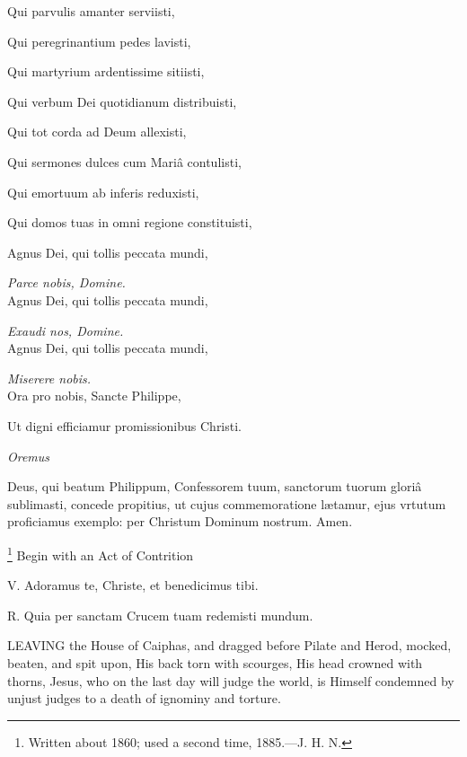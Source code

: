 Qui parvulis amanter serviisti,

Qui peregrinantium pedes lavisti,

Qui martyrium ardentissime sitiisti,

Qui verbum Dei quotidianum distribuisti,

Qui tot corda ad Deum allexisti,

Qui sermones dulces cum Mariâ contulisti,

Qui emortuum ab inferis reduxisti,

Qui domos tuas in omni regione constituisti,

Agnus Dei, qui tollis peccata
mundi,

\emph{Parce nobis, Domine.}\\
Agnus Dei, qui tollis peccata mundi,

\emph{Exaudi nos, Domine.}\\
Agnus Dei, qui tollis peccata mundi,

\emph{Miserere nobis.} \emph{}\\
Ora pro nobis, Sancte Philippe,

Ut digni efficiamur promissionibus Christi.

\emph{Oremus}

Deus, qui beatum Philippum,
Confessorem tuum, sanctorum tuorum gloriâ sublimasti, concede propitius,
ut cujus commemoratione lætamur, ejus vrtutum proficiamus exemplo: per
Christum Dominum nostrum. Amen.



\footnote{

Written about 1860; used a
second time, 1885.—J. H. N.}
Begin with an Act of Contrition


V. Adoramus te, Christe, et
benedicimus tibi.

R. Quia per sanctam Crucem tuam redemisti mundum.

LEAVING the House of
Caiphas, and dragged before Pilate and Herod, mocked, beaten, and spit
upon, His back torn with scourges, His head crowned with thorns, Jesus,
who on the last day will judge the world, is Himself condemned by unjust
judges to a death of ignominy and torture.

